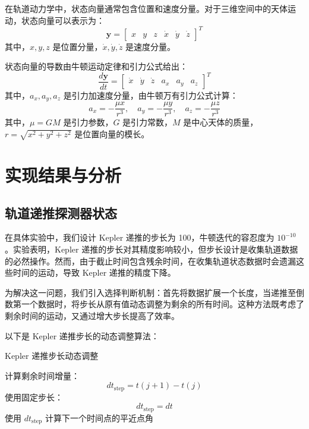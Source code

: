 \documentclass[12pt,a4paper]{article}
\begin{document}
在轨道动力学中，状态向量通常包含位置和速度分量。对于三维空间中的天体运动，状态向量可以表示为：
\[
\mathbf{y} = \begin{bmatrix}
x & y & z & \dot{x} & \dot{y} & \dot{z}
\end{bmatrix} ^ {T}
\]
其中，\(x, y, z\) 是位置分量，\(\dot{x}, \dot{y}, \dot{z}\) 是速度分量。

状态向量的导数由牛顿运动定律和引力公式给出：
\[
\frac{d\mathbf{y}}{dt} = \begin{bmatrix}
\dot{x} & \dot{y} & \dot{z} & a_x & a_y & a_z
\end{bmatrix} ^ {T}
\]
其中，\(a_x, a_y, a_z\) 是引力加速度分量，由牛顿万有引力公式计算：
\[
a_x = -\frac{\mu x}{r^3}, \quad a_y = -\frac{\mu y}{r^3}, \quad a_z = -\frac{\mu z}{r^3}
\]
其中，\(\mu = GM\) 是引力参数，\(G\) 是引力常数，\(M\) 是中心天体的质量，\(r = \sqrt{x^2 + y^2 + z^2}\) 是位置向量的模长。



\section{实现结果与分析}
\subsection{轨道递推探测器状态}

在具体实验中，我们设计 Kepler 递推的步长为 100，牛顿迭代的容忍度为 \(10^{-10}\)。实验表明，Kepler 递推的步长对其精度影响较小，但步长设计是收集轨道数据的必然操作。然而，由于截止时间包含残余时间，在收集轨道状态数据时会遗漏这些时间的运动，导致 Kepler 递推的精度下降。

为解决这一问题，我们引入选择判断机制：首先将数据扩展一个长度，当递推至倒数第一个数据时，将步长从原有值动态调整为剩余的所有时间。这种方法既考虑了剩余时间的运动，又通过增大步长提高了效率。

以下是 Kepler 递推步长的动态调整算法：

\begin{algorithm}
\caption{Kepler 递推步长动态调整}
\begin{algorithmic}
        \STATE 计算剩余时间增量：
        \[
        dt_{\text{step}} = t(j+1) - t(j)
        \]
    \ELSE
        \STATE 使用固定步长：
        \[
        dt_{\text{step}} = dt
        \]
    \ENDIF
    \STATE 使用 \(dt_{\text{step}}\) 计算下一个时间点的平近点角
\ENDFOR
\end{algorithmic}
\end{algorithm}
\end{document}
